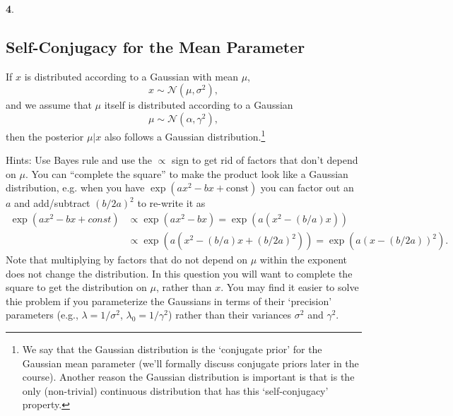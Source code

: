 \documentclass{article}
\begin{document}
\textbf{4}.



\newpage
\subsection{Self-Conjugacy for the Mean Parameter}

If $x$ is distributed according to a Gaussian with mean $\mu$,
\[
x \sim \mathcal{N}(\mu,\sigma^2),
\]
and we assume that $\mu$ itself is distributed according to a Gaussian
\[
\mu \sim \mathcal{N}(\alpha,\gamma^2),
\]
then the posterior $\mu | x$ also follows a Gaussian distribution.\footnote{We say that the Gaussian distribution is the `conjugate prior' for the Gaussian mean parameter (we'll formally discuss conjugate priors later in the course). Another reason the Gaussian distribution is important is that is the only (non-trivial) continuous distribution that has this `self-conjugacy' property.}  %

Hints: Use Bayes rule and use the $\propto$ sign to get rid of factors that don't depend on $\mu$. You can ``complete the square'' to make the product look like a Gaussian distribution, e.g. when you have $\exp(ax^2 - bx + \text{const})$ you can factor out an $a$ and add/subtract $(b/2a)^2$ to re-write it as
\begin{align*}
\exp\left(ax^2 - bx + const\right) & \propto
\exp\left(ax^2 - bx\right) = \exp\left(a(x^2 - (b/a)x)\right) \\& \propto \exp\left(a(x^2 - (b/a)x + (b/2a)^2)\right) =  \exp\left(a(x - (b/2a))^2\right).
\end{align*}
Note that multiplying by factors that do not depend on $\mu$ within the exponent does not change the distribution. In this question you will want to complete the square to get the distribution on $\mu$, rather than $x$.
You may find it easier to solve thie problem if you parameterize the Gaussians in terms of their `precision' parameters (e.g., $\lambda = 1/\sigma^2$, $\lambda_0 = 1/\gamma^2$) rather than their variances $\sigma^2$ and $\gamma^2$.
\end{document}
